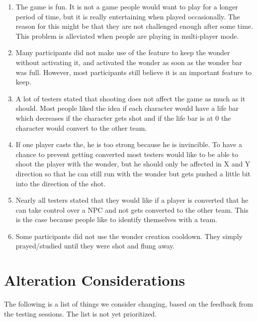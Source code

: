 \documentclass[11pt,a4paper,titlepage,table]{article}
\begin{document}
	\begin{enumerate}
\item The game is fun. It is not a game people would want to play for a longer period of time, but it is really entertaining when played occasionally. The reason for this might be that they are not challenged enough after some time. This problem is alleviated when people are playing in multi-player mode.
\item Many participants did not make use of the feature to keep the wonder without activating it, and activated the wonder as soon as the wonder bar was full. However, most participants still believe it is an important feature to keep.
\item A lot of testers stated that shooting does not affect the game as much as it should. Most people liked the idea if each character would have a life bar which decreases if the character gets shot and if the life bar is at 0 the character would convert to the other team.
\item If one player casts the, he is too strong because he is invincible. To have a chance to prevent getting converted most testers would like to be able to shoot the player with the wonder, but he should only be affected in X and Y direction so that he can still run with the wonder but gets pushed a little bit into the direction of the shot.
\item Nearly all testers stated that they would like if a player is converted that he can take control over a NPC and not gets converted to the other team. This is the case because people like to identify themselves with a team.
\item Some participants did not use the wonder creation cooldown. They simply prayed/studied until they were shot and flung away.
\end{enumerate}

\section{Alteration Considerations}
The following is a list of things we consider changing, based on the feedback from the testing sessions. The list is not yet prioritized.
\end{document}
